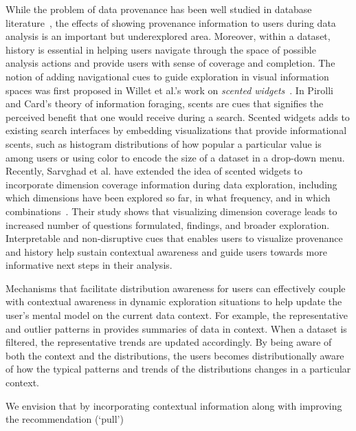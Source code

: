 \par While the problem of data provenance 
has been well studied in database literature~\cite{Buneman2006,Cui2003,Woodruff1997}, the effects of showing provenance information 
to users during data analysis is an important but underexplored area. 
Moreover, within a dataset, history is essential 
in helping users navigate through the space 
of possible analysis actions and provide users 
with sense of coverage and completion. 
The notion of adding navigational cues 
to guide exploration in visual information spaces 
was first proposed in Willet et al.'s work on \textit{scented widgets}~\cite{Willett2007}. In Pirolli and Card's theory of information foraging, 
scents are cues that signifies the perceived benefit 
that one would receive during a search. 
Scented widgets adds to existing search interfaces 
by embedding visualizations that provide informational scents, 
such as histogram distributions of how popular a particular value is among users or using color to encode the size of a dataset in a drop-down menu. 
Recently, Sarvghad et al. have extended the idea 
of scented widgets to incorporate dimension coverage 
information during data exploration, 
including which dimensions have been explored so far, 
in what frequency, and in which combinations~\cite{Sarvghad2017}. 
Their study shows that visualizing dimension coverage 
leads to increased number of questions formulated, findings, and broader exploration. Interpretable and non-disruptive cues that enables 
users to visualize provenance and history help sustain contextual awareness and guide users towards 
more informative next steps in their analysis.%
\par Mechanisms that facilitate distribution awareness 
for users can effectively couple with contextual awareness 
in dynamic exploration situations 
to help update the user's mental model 
on the current data context. 
For example, the representative and outlier patterns 
in \zv provides summaries of data in context. 
When a dataset is filtered, the representative trends 
are updated accordingly. By being aware of both the 
context and the distributions, the users becomes 
distributionally aware of how the typical patterns 
and trends of the distributions changes in a particular context. %
\par We envision that by incorporating contextual 
information along with improving the recommendation (`pull') 
